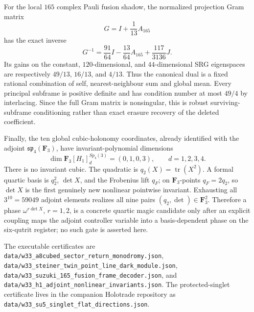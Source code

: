For the local $165$ complex Pauli fusion shadow, the normalized projection Gram matrix
\[
 G=I+\frac1{13}A_{165}
\]
has the exact inverse
\[
 \boxed{G^{-1}=\frac{91}{64}I-\frac{13}{64}A_{165}+\frac{117}{3136}J}.
\]
Its gains on the constant, $120$-dimensional, and $44$-dimensional SRG eigenspaces are respectively $49/13$, $16/13$, and $4/13$.  Thus the canonical dual is a fixed rational combination of self, nearest-neighbour sum and global mean.  Every principal subframe is positive definite and has condition number at most $49/4$ by interlacing.  Since the full Gram matrix is nonsingular, this is robust surviving-subframe conditioning rather than exact erasure recovery of the deleted coefficient.

Finally, the ten global cubic-holonomy coordinates, already identified with the adjoint $\mathfrak{sp}_4(\mathbf F_3)$, have invariant-polynomial dimensions
\[
 \dim \mathbf F_3[H_1]_d^{Sp_4(3)}=(0,1,0,3),\qquad d=1,2,3,4.
\]
There is no invariant cubic.  The quadratic is $q_2(X)=\operatorname{tr}(X^2)$.  A formal quartic basis is $q_2^2$, $\det X$, and the Frobenius lift $q_F$; on $\mathbf F_3$-points $q_F=2q_2$, so $\det X$ is the first genuinely new nonlinear pointwise invariant.  Exhausting all $3^{10}=59049$ adjoint elements realizes all nine pairs $(q_2,\det)\in\mathbf F_3^2$.  Therefore a phase $\omega^{r\det X}$, $r=1,2$, is a concrete quartic magic candidate only after an explicit coupling maps the adjoint controller variable into a basis-dependent phase on the six-qutrit register; no such gate is asserted here.

The executable certificates are
\texttt{data/w33\_a8cubed\_sector\_return\_monodromy.json},
\texttt{data/w33\_steiner\_twin\_point\_line\_dark\_module.json},
\texttt{data/w33\_suzuki\_165\_fusion\_frame\_decoder.json}, and
\texttt{data/w33\_h1\_adjoint\_nonlinear\_invariants.json}.
The protected-singlet certificate lives in the companion Holotrade repository as
\texttt{data/w33\_su5\_singlet\_flat\_directions.json}.
